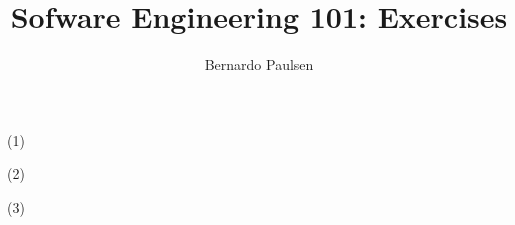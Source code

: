\documentclass{article}
\title{Sofware Engineering 101: Exercises}
\author{Bernardo Paulsen}
\begin{document}
    
\maketitle

(1)

(2)

(3)








\end{document}
